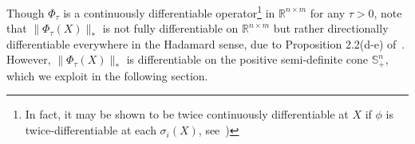 \documentclass[10pt]{article}
\numberwithin{equation}{section}
\newcommand{\+}{%
	\raisebox{0.18ex}{\scaleobj{0.55}{+}}
}
\theoremstyle{definition}
\theoremstyle{definition}
\begin{document}
	Though $\Phi_\tau$ is a continuously differentiable operator\footnote{In fact, it may be shown to be twice continuously differentiable at $X$ if $\phi$ is twice-differentiable at each $\sigma_i(X)$, see~\cite{ding2018spectral})} in $\mathbb{R}^{n \times m}$ for any $\tau > 0$, %
note that $\lVert\Phi_\tau(X)\rVert_\ast$ is not fully differentiable on $\mathbb{R}^{n \times m}$ but rather directionally differentiable everywhere in the Hadamard sense, due to Proposition 2.2(d-e)  of~\cite{bi2013approximation}. 
However, $\lVert\Phi_\tau(X)\rVert_\ast$ is differentiable on the positive semi-definite cone $\mathbb{S}^n_+$, which we exploit in the following section. 
 
%

\end{document}
